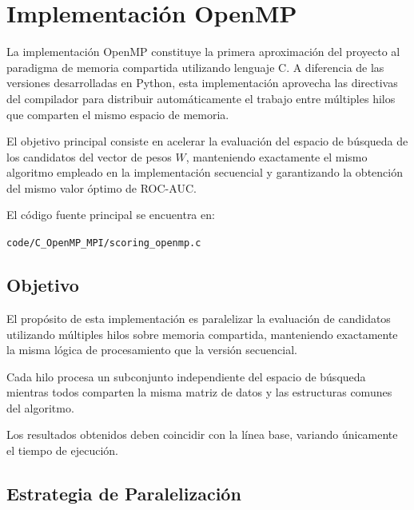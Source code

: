 
\chapter{Implementación OpenMP}

La implementación OpenMP constituye la primera aproximación del proyecto al paradigma de memoria compartida utilizando lenguaje C. A diferencia de las versiones desarrolladas en Python, esta implementación aprovecha las directivas del compilador para distribuir automáticamente el trabajo entre múltiples hilos que comparten el mismo espacio de memoria.

El objetivo principal consiste en acelerar la evaluación del espacio de búsqueda de los candidatos del vector de pesos \(W\), manteniendo exactamente el mismo algoritmo empleado en la implementación secuencial y garantizando la obtención del mismo valor óptimo de ROC-AUC.

El código fuente principal se encuentra en:

\begin{center}
\texttt{code/C\_OpenMP\_MPI/scoring\_openmp.c}
\end{center}


\section{Objetivo}

El propósito de esta implementación es paralelizar la evaluación de candidatos utilizando múltiples hilos sobre memoria compartida, manteniendo exactamente la misma lógica de procesamiento que la versión secuencial.

Cada hilo procesa un subconjunto independiente del espacio de búsqueda mientras todos comparten la misma matriz de datos y las estructuras comunes del algoritmo.

Los resultados obtenidos deben coincidir con la línea base, variando únicamente el tiempo de ejecución.


\section{Estrategia de Paralelización}

